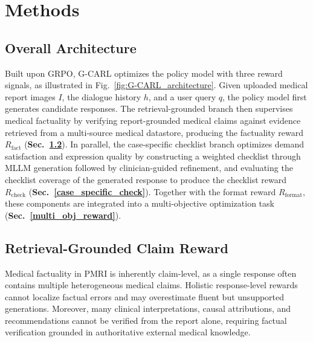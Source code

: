 \documentclass[letterpaper]{article} %
\begin{document}
\section{Methods}

\subsection{Overall Architecture}
Built upon GRPO, G-CARL optimizes the policy model with three reward signals, as illustrated in Fig.~\ref{fig:G-CARL_architecture}. Given uploaded medical report images $I$, the dialogue history $h$, and a user query $q$, the policy model first generates candidate responses. The retrieval-grounded branch then supervises medical factuality by verifying report-grounded medical claims against evidence retrieved from a multi-source medical datastore, producing the factuality reward $R_{\mathrm{fact}}$ (\textbf{\textcolor{deepred}{Sec.~\ref{retrieval_grounded}}}). In parallel, the case-specific checklist branch optimizes demand satisfaction and expression quality by constructing a weighted checklist through MLLM generation followed by clinician-guided refinement, and evaluating the checklist coverage of the generated response to produce the checklist reward $R_{\mathrm{check}}$ (\textbf{\textcolor{deepred}{Sec.~\ref{case_specific_check}}}). Together with the format reward $R_{\mathrm{format}}$, these components are integrated into a multi-objective optimization task (\textbf{\textcolor{deepred}{Sec.~\ref{multi_obj_reward}}}).


\subsection{Retrieval-Grounded Claim Reward}
\label{retrieval_grounded}
Medical factuality in PMRI is inherently claim-level, as a single response often contains multiple heterogeneous medical claims. Holistic response-level rewards cannot localize factual errors and may overestimate fluent but unsupported generations. Moreover, many clinical interpretations, causal attributions, and recommendations cannot be verified from the report alone, requiring factual verification grounded in authoritative external medical knowledge. 
\end{document}
